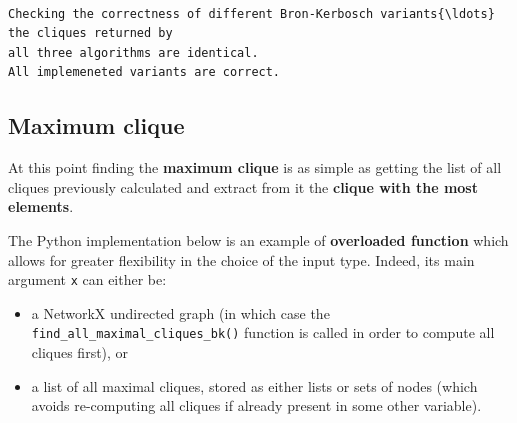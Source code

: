 \documentclass[11pt]{article}
\begin{document}
    \begin{Verbatim}[commandchars=\\\{\}]

Checking the correctness of different Bron-Kerbosch variants{\ldots} the cliques returned by
all three algorithms are identical.
All implemeneted variants are correct.
    \end{Verbatim}

    \hypertarget{finding-the-maximum-clique}{%
\subsection{Maximum
clique}\label{finding-the-maximum-clique}}

At this point finding the \textbf{maximum clique} is as simple as
getting the list of all cliques previously calculated and extract from
it the \textbf{clique with the most elements}.

The Python implementation below is an example of \textbf{overloaded
function} which allows for greater flexibility in the choice of the
input type. Indeed, its main argument \texttt{x} can either be:

\begin{itemize}
    \item a NetworkX undirected graph (in which case the
\texttt{find\_all\_maximal\_cliques\_bk()} function is called in order
to compute all cliques first), or \item a list of all maximal cliques,
stored as either lists or sets of nodes (which avoids re-computing all
cliques if already present in some other variable).
\end{itemize}
\end{document}
